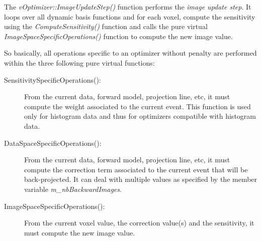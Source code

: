 \documentclass[a4paper, 11pt]{article}
\begin{document}
The \textit{vOptimizer::ImageUpdateStep()} function performs the \textit{image update step}. It loops over all dynamic basis functions and for each voxel, compute the
sensitivity using the \textit{ComputeSensitivity()} function and calls the pure virtual \textit{ImageSpaceSpecificOperations()} function to compute the new image value.\\

\bigskip

So basically, all operations specific to an optimizer without penalty are performed within the three following pure virtual functions:
\begin{description}
  \item[SensitivitySpecificOperations():]
From the current data, forward model, projection line, etc, it must compute the weight associated to the current event.
This function is used only for histogram data and thus for optimizers compatible with histogram data.
  \item[DataSpaceSpecificOperations():]
From the current data, forward model, projection line, etc, it must compute the correction term associated to the current event that will be back-projected.
It can deal with multiple values as specified by the member variable \textit{m\_nbBackwardImages}.
  \item[ImageSpaceSpecificOperations():]
From the current voxel value, the correction value(s) and the sensitivity, it must compute the new image value.
\end{description}

\bigskip
\end{document}
